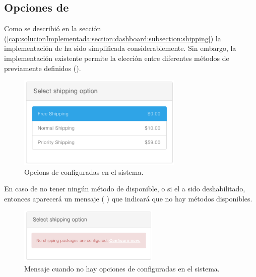 \subsection{Opciones de \ShippingCOM}\label{chapter:solucionimplementada:section:shipping_options}

	Como se describió en la sección  (\ref{cap:solucionImplementada:section:dashboard:subsection:shipping}) la implementación de \ShippingCOM ha sido simplificada considerablemente. Sin embargo, la implementación existente permite la elección entre diferentes métodos de \ShippingCOM previamente definidos (). 

	\begin{figure}[H]
		\centering
		\includegraphics[width=0.7\textwidth]{figuras/checkout/shipping_options.png}
		\caption{Opcions de \shippingEF configuradas en el sistema.}
		\label{figure:shipping:checkout:select_option}
	\end{figure}

	En caso de no tener ningún método de \shippingEF disponible, o si el \packageAS a sido deshabilitado, entonces aparecerá un mensaje ( ) que indicará que no hay métodos disponibles.

	\begin{figure}[H]
		\centering
		\includegraphics[width=0.6\textwidth]{figuras/checkout/shipping_methods_unavailable.png}
		\caption{Mensaje cuando no hay opciones de \shippingEF configuradas en el sistema.}
		\label{figure:shipping:checkout:shipping_methods_unavailable}
	\end{figure}